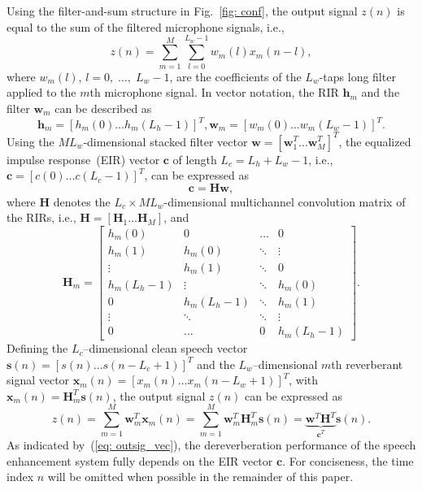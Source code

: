 \documentclass[fleqn]{aes2e}
\begin{document}
Using the filter-and-sum structure in Fig.~\ref{fig: conf}, the output signal $z(n)$ is equal to the sum of the filtered microphone signals, i.e.,
\begin{equation}
\label{eq: out_sig}
z(n) = \sum_{m=1}^M \sum_{l = 0}^{L_w-1} w_m(l) x_m(n-l),
\end{equation}
where $w_m(l)$, $l = 0, \; \ldots, \; L_w-1$, are the coefficients of the $L_w$-taps long filter applied to the $m$th microphone signal.
In vector notation, the RIR $\mathbf{h}_m$ and the filter $\mathbf{w}_m$ can be described as
\begin{equation*}
\!\!\!\!\!\!\mathbf{h}_m = [h_m(0)  \ldots  h_m(L_h\!\!-\!\!1)]^T\!\!\!, \mathbf{w}_m  = [w_m(0) \ldots w_m(L_w\!\!-\!\!1)]^T\!\!\!.
\end{equation*}
Using the $M L_w$-dimensional stacked filter vector $\mathbf{w} = [\mathbf{w}^T_1  \ldots \mathbf{w}^T_M]^T$, the equalized impulse response~(EIR) vector $\mathbf{c}$ of length $L_c = L_h+L_w-1$, i.e., $\mathbf{c} = [c(0) \ldots c(L_c-1)]^T$, can be expressed as
\begin{equation}
\label{eq: eir_vec}
\mathbf{c} = \mathbf{H}\mathbf{w},
\end{equation}
where  $\mathbf{H}$ denotes the $L_c \times ML_w$-dimensional multichannel convolution matrix of the RIRs, i.e., $\mathbf{H}  = [\mathbf{H}_1 \ldots \mathbf{H}_M]$, and
\begin{equation}
\mathbf{H}_m \! = \! \begin{bmatrix}
    h_m(0) & 0 &  \ldots & 0 \\
    h_m(1) & h_m(0) & \ddots & \vdots \\
    \vdots & h_m(1) & \ddots & 0 \\
    h_m(L_h\!-\!1) & \vdots & \ddots & h_m(0) \\
    0 & h_m(L_h\!-\!1) & \ddots & h_m(1) \\
    \vdots & \ddots & \ddots & \vdots \\
    0 & \ldots & 0 & h_m(L_h\!-\!1)
   \end{bmatrix}.
 \end{equation}
Defining the $L_c$--dimensional clean speech vector $\mathbf{s}(n) = [s(n) \ldots s(n-L_c+1)]^T$ and the $L_w$--dimensional $m$th reverberant signal vector $\mathbf{x}_m(n) = [x_m(n) \ldots x_m(n-L_w+1)]^T$, with $\mathbf{x}_m(n) = \mathbf{H}_m^T \mathbf{s}(n)$, the output signal $z(n)$ can be expressed as
\begin{equation}
\label{eq: outsig_vec}
z(n) \!\!=\!\! \sum_{m=1}^M \mathbf{w}_m^T\mathbf{x}_m(n) \!\!=\!\! \sum_{m=1}^M \mathbf{w}_m^T\mathbf{H}^T_m\mathbf{s}(n) \!\!=\!\! \underbrace{\mathbf{w}^T\mathbf{H}^T}_{\mathbf{c}^T}\mathbf{s}(n).
\end{equation}
As indicated by~(\ref{eq: outsig_vec}), the dereverberation performance of the speech enhancement system fully depends on the EIR vector $\mathbf{c}$.
For conciseness, the time index $n$ will be omitted when possible in the remainder of this paper.
\end{document}
